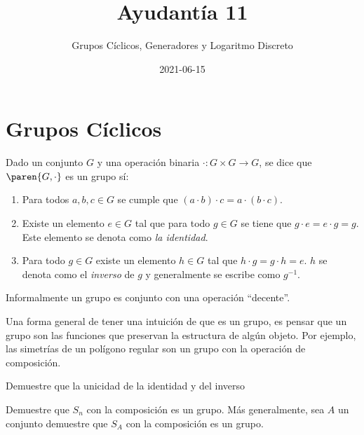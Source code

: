 \documentclass{ayudantia}
\title{Ayudantía 11}
\subtitle{Grupos Cíclicos, Generadores y Logaritmo Discreto}
\date{2021-06-15}
\begin{document}
\maketitle
\section{Grupos Cíclicos}

\begin{defn}[Grupo]
    Dado un conjunto \(G\) y una operación binaria \(\cdot :G\times G\rightarrow G\), se dice que \(\paren{G,\cdot}\) es un grupo sí:
    \begin{enumerate}
        \item Para todos \(a,b,c\in G\) se cumple que \((a\cdot b)\cdot c=a\cdot (b\cdot c)\).
        \item Existe un elemento \(e\in G\) tal que para todo \(g\in G\) se tiene que \(g\cdot e=e\cdot g=g\). Este elemento se denota como \textit{la identidad}.
        \item Para todo \(g\in G\) existe un elemento \(h\in G\) tal que \(h\cdot g=g\cdot h=e\). \(h\) se denota como el \textit{inverso} de \(g\) y generalmente se escribe como \(g^{-1}\).
    \end{enumerate}
\end{defn}
\begin{remark}
    Informalmente un grupo es conjunto con una operación ``decente''.
\end{remark}
\begin{remark}
    Una forma general de tener una intuición de que es un grupo, es pensar que un grupo son las funciones que preservan la estructura de algún objeto. Por ejemplo, las simetrías de un polígono regular son un grupo con la operación de composición.
\end{remark}
\begin{prob}
    Demuestre que la unicidad de la identidad y del inverso 
\end{prob}
\begin{prob}
    Demuestre que \(S_n\) con la composición es un grupo. Más generalmente, sea \(A\) un conjunto demuestre que \(S_A\) con la composición es un grupo.
\end{prob}
\end{document}
